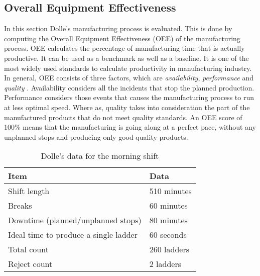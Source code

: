 \documentclass[runningheads]{llncs}
\begin{document}
\subsection{Overall Equipment Effectiveness}
\iffalse
This section evaluates the Overall Equipment Effectiveness (OEE)  of Dolle's manufacturing process. OEE calculates the percentage of manufacturing time that is actually productive. It can be used as a benchmark as well as a baseline. It is one of the most widely used standards to calculate productivity in manufacturing industry. In general, OEE consists of three factors, which are \emph{availability}, \emph{performance} and \emph{quality} \cite{oee}. Availability considers all the incidents that stop the planned production. Performance considers those events that causes the manufacturing process to run at less optimal speed. Where as, quality takes into consideration the manufactured products that do not meet the quality standards. An OEE score of 100\% means that the manufacturing is going along at an optimal pace, without any unplanned stops and producing only good quality products. 
\fi
In this section Dolle's manufacturing process is evaluated. This is done by computing the Overall Equipment Effectiveness (OEE) of the manufacturing process. OEE calculates the percentage of manufacturing time that is actually productive. It can be used as a benchmark as well as a baseline. It is one of the most widely used standards to calculate productivity in manufacturing industry. In general, OEE consists of three factors, which are \emph{availability}, \emph{performance} and \emph{quality} \cite{oee}. Availability considers all the incidents that stop the planned production. Performance considers those events that causes the manufacturing process to run at less optimal speed. Where as, quality takes into consideration the part of the manufactured products that do not meet quality standards. An OEE score of 100\% means that the manufacturing is going along at a perfect pace, without any unplanned stops and producing only good quality products. 

\begin{table}[]
\label{tab:distance}
\centering
\caption{Dolle's data for the morning shift}
\begin{tabular}{p{5.7cm}|p{5.7cm}}
\hline
\multicolumn{1}{l}{\textbf{Item}} &  \textbf{Data} \\ \hline
Shift length            & 510 minutes\\
Breaks           &  60 minutes\\
Downtime (planned/unplanned stops)            &   80 minutes\\
Ideal time to produce a single ladder   &   60 seconds\\
Total count  & 260 ladders\\
Reject count & 2 ladders\\

\hline
\end{tabular}
\label{tab:data}
\end{table}
\end{document}

